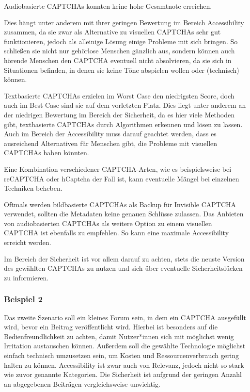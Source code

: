 Audiobasierte CAPTCHAs konnten keine hohe Gesamtnote erreichen.

Dies hängt unter anderem mit ihrer geringen Bewertung im Bereich Accessibility zusammen,
da sie zwar als Alternative zu visuellen CAPTCHAs sehr gut funktionieren, jedoch als alleinige Lösung einige Probleme mit sich bringen.
So schließen sie nicht nur gehörlose Menschen gänzlich aus, sondern können auch hörende Menschen den CAPTCHA eventuell nicht absolvieren,
da sie sich in Situationen befinden, in denen sie keine Töne abspielen wollen oder (technisch) können.

Textbasierte CAPTCHAs erzielen im Worst Case den niedrigsten Score, doch auch im Best Case sind sie auf dem vorletzten Platz.
Dies liegt unter anderem an der niedrigen Bewertung im Bereich der Sicherheit, 
da es hier viele Methoden gibt, textbasierte CAPTCHAs durch Algorithmen erkennen und lösen zu lassen.
Auch im Bereich der Accessibility muss darauf geachtet werden, dass es ausreichend Alternativen für Menschen gibt,
die Probleme mit visuellen CAPTCHAs haben könnten.

Eine Kombination verschiedener CAPTCHA-Arten, wie es beispielsweise bei reCAPTCHA oder hCaptcha der Fall ist, 
kann eventuelle Mängel bei einzelnen Techniken beheben.

Oftmals werden bildbasierte CAPTCHAs als Backup für Invisible CAPTCHA verwendet, sollten die Metadaten keine genauen Schlüsse zulassen.
Das Anbieten von audiobasierten CAPTCHAs als weitere Option zu einem visuellen CAPTCHA ist ebenfalls zu empfehlen.
So kann eine maximale Accessibility erreicht werden.

Im Bereich der Sicherheit ist vor allem darauf zu achten, stets die neuste Version des gewählten CAPTCHAs zu nutzen 
und sich über eventuelle Sicherheitslücken zu informieren.

\subsubsection*{Beispiel 2}
Das zweite Szenario soll ein kleines Forum sein, in dem ein CAPTCHA ausgefüllt wird, bevor ein Beitrag veröffentlicht wird.
Hierbei ist besonders auf die Bedienfreundlichkeit zu achten, damit Nutzer*innen sich mit möglichst wenig Irritation austauschen können.
Außerdem soll die gewählte Technologie möglichst einfach technisch umzusetzen sein, um Kosten und Ressourcenverbrauch gering halten zu können.
Accessibility ist zwar auch von Relevanz, jedoch nicht so stark wie zuvor genannte Kategorien.
Die Sicherheit ist aufgrund der geringen Anzahl an abgegebenen Beiträgen vergleichsweise unwichtig.

